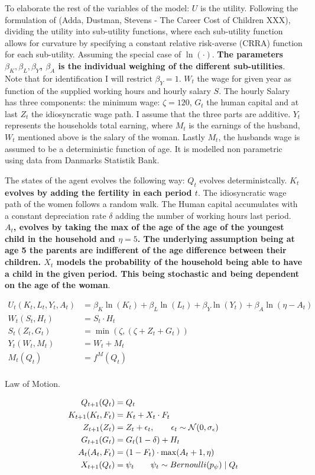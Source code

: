 To elaborate the rest of the variables of the model: $U$ is the utility. Following the formulation of (Adda, Dustman, Stevens - The Career Cost of Children XXX), dividing the utility into sub-utility functions, where each sub-utility function allows for curvature by specifying a constant relative risk-averse (CRRA) function for each sub-utility. Assuming the special case of $\ln(\cdot)$. \textbf{The parameters $\beta_K, \beta_L, \beta_Y$, $\beta_A$ is the individual weighing of the different sub-utilities}. Note that for identification I will restrict $\beta_Y= 1$. $W_t$ the wage for given year as function of the supplied working hours and hourly salary $S$. The hourly Salary has three components: the minimum wage: $\zeta=120$, $G_t$ the human capital and at last $Z_t$ the idiosyncratic wage path. I assume that the three parts are additive. $Y_t$ represents the households total earning, where $M_t$ is the earnings of the husband, $W_t$ mentioned above is the salary of the woman. Lastly $M_t$, the husbands wage is assumed to be a deterministic function of age. It is modelled non parametric using data from Danmarks Statistik Bank.

The states of the agent evolves the following way: $Q_t$ evolves deterministcally. \textbf{$K_t$ evolves by adding the fertility in each period $t$}. The idiosyncratic wage path of the women follows a random walk. The Human capital accumulates with a constant depreciation rate $\delta$ adding the number of working hours last period. \textbf{$A_t$, evolves by taking the max of the age of the age of the youngest child in the household and $\eta=5$. The underlying assumption being at age 5 the parents are indifferent of the age difference between their children. $X_t$ models the probability of the household being able to have a child in the given period. This being stochastic and being dependent on the age of the woman}.

\begin{align}
    U_t(K_t, L_t, Y_t, A_t) &= \beta_K \ln(K_t) + \beta_L \ln(L_t) + \beta_Y \ln(Y_t) + \beta_A \ln(\eta - A_t) \\
    W_t(S_t, H_t) &=S_t \cdot H_t \\
    S_t(Z_t, G_t) &= \min(\zeta, (\zeta + Z_t + G_t))  \\
    Y_t(W_t, M_t) &= W_t + M_t\\
    M_t(Q_t) &= f^M(Q_t) \\
\end{align}


Law of Motion.

\begin{align}
    Q_{t+1}(Q_t) &= Q_t \\
    K_{t+1}(K_t, F_t)  &= K_{t} + X_t \cdot F_{t} \\
    Z_{t+1}(Z_t) &= Z_t + \epsilon_t, \qquad \epsilon_t \sim \mathcal{N}(0, \sigma_\epsilon) \\
    G_{t+1}(G_t) &= G_t(1 - \delta) + H_t \\
    A_t(A_t, F_t) &= (1 - F_t) \cdot \max(A_t + 1, \eta)  \\
    X_{t+1}(Q_t) &= \psi_t \qquad \psi_t \sim Bernoulli(p_\psi) \mid Q_t
\end{align}

